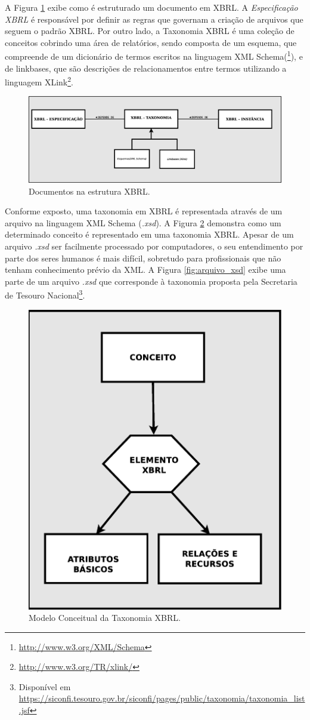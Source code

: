 \documentclass[msc,proposal,hidelot,hideabstract]{ppgccufmg} %
\begin{document}
A Figura \ref{fig:docs_xbrl} exibe como é estruturado um documento em XBRL. A \textit{Especificação XBRL} é responsável por definir as regras que governam a criação de arquivos
que seguem o padrão XBRL. Por outro lado, a Taxonomia XBRL é uma coleção de conceitos cobrindo uma área
de relatórios, sendo composta de um esquema, que compreende de um dicionário de termos escritos na linguagem XML Schema(\footnote{\url{http://www.w3.org/XML/Schema}}), e de linkbases, que são descrições de relacionamentos entre termos utilizando a linguagem XLink\footnote{\url{http://www.w3.org/TR/xlink/}}.

\begin{figure}[hbtp]
\centering
\includegraphics[width=1.0\textwidth]{../img/documentos_in_xbrl.eps}
\caption{Documentos na estrutura XBRL.}
\label{fig:docs_xbrl}
\end{figure}

Conforme exposto, uma taxonomia em XBRL é representada através de um arquivo na linguagem XML Schema (\textit{.xsd}). A Figura \ref{fig:taxonomia_xbrl} demonstra como um determinado conceito é representado em uma taxonomia XBRL. Apesar de um arquivo \textit{.xsd} ser facilmente processado por computadores, o seu entendimento por parte dos seres humanos é mais difícil, sobretudo para profissionais que não tenham conhecimento prévio da XML. A Figura \ref{fig:arquivo_xsd} exibe uma parte de um arquivo \textit{.xsd} que corresponde à taxonomia proposta pela Secretaria de Tesouro Nacional\footnote{Disponível em \url{https://siconfi.tesouro.gov.br/siconfi/pages/public/taxonomia/taxonomia_list.jsf}}.

\begin{figure}[hbtp]
\centering
\includegraphics[width=.5\textwidth]{../img/taxonomia.eps}
\caption{Modelo Conceitual da Taxonomia XBRL.}
\label{fig:taxonomia_xbrl}
\end{figure}
\end{document}
